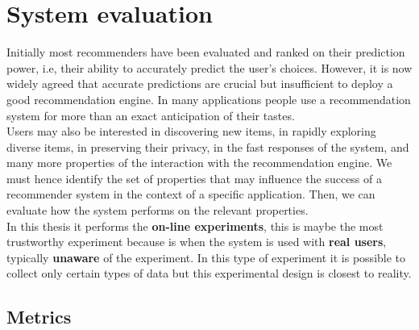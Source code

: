 \chapter{System evaluation} \label{evaluation}

Initially most recommenders have been evaluated and ranked on their
prediction power, i.e, their ability to accurately predict the user's
choices. However, it is now widely agreed that accurate predictions
are crucial but insufficient to deploy a good recommendation engine.
In many applications people use a recommendation system for more than
an exact anticipation of their tastes.\\ Users may also be interested
in discovering new items, in rapidly exploring diverse items, in
preserving their privacy, in the fast responses of the system, and
many more properties of the interaction with the recommendation
engine. We must hence identify the set of properties that may
influence the success of a recommender system in the context of a
specific application. Then, we can evaluate how the system performs on
the relevant properties\cite{adomavicius2011context}.\\ 
In this thesis it performs the \textbf{on-line experiments}, 
this is maybe the most trustworthy experiment because is when 
the system is  used with \textbf{real users}, typically 
\textbf{unaware} of the experiment. In this type of experiment 
it is possible to collect only certain types
of data but this experimental design is closest to reality.

\section{Metrics}


